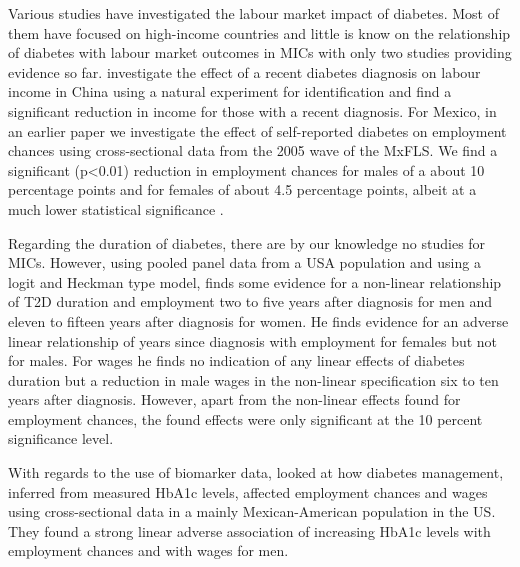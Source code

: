 Various studies have investigated the labour market impact of diabetes.
Most of them have focused on high-income countries and little is know
on the relationship of diabetes with labour market outcomes in \ac{MICs} with only two studies providing evidence
so far. \citet{Liu2014} investigate the effect of a recent diabetes
diagnosis on labour income in China using a natural experiment for
identification and find a significant reduction in income for those
with a recent diagnosis. For Mexico, in an earlier paper we investigate
the effect of self-reported diabetes on employment chances using cross-sectional
data from the 2005 wave of the \ac{MxFLS}. We find a significant
(p<0.01) reduction in employment chances for males of a about 10 percentage
points and for females of about 4.5 percentage points, albeit at a
much lower statistical significance \citep{Seuring2015}. 

Regarding the duration of diabetes, there are by our knowledge no studies for \ac{MICs}. However, using pooled panel data from a
\ac{USA} population and using a logit and Heckman type model, \citet{Minor2013} finds
some evidence for a non-linear relationship of \ac{T2D} duration
and employment two to five years after diagnosis for men and eleven
to fifteen years after diagnosis for women. He finds evidence for an adverse linear relationship of years since diagnosis with employment for females but not for males. For wages he finds no indication of any linear effects of diabetes duration but a reduction in male wages in the non-linear specification six to ten years after diagnosis. However, apart from the non-linear effects found for employment chances, the found effects were only significant at the 10 percent significance level.

With regards to the use of biomarker data,\citet{BrownIII2011} looked
at how diabetes management, inferred from measured \ac{HbA1c} levels,
affected employment chances and wages using cross-sectional data in
a mainly Mexican-American population in the US. They found a strong linear adverse association of
increasing \ac{HbA1c} levels with employment chances and
with wages for men.


